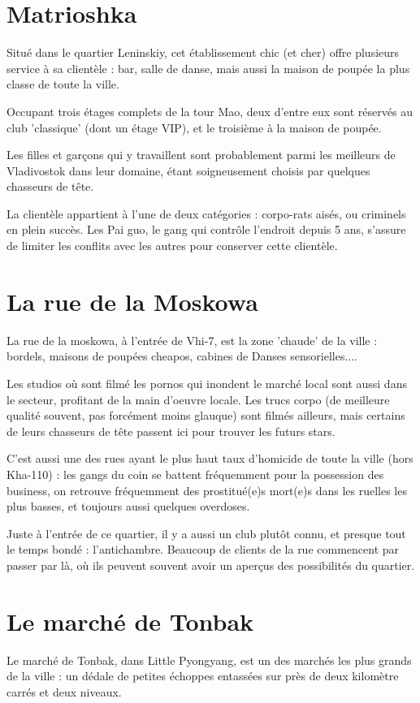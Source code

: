 \documentclass[10pt,a4paper]{book}
\begin{document}
\section{Matrioshka}
Situé dans le quartier Leninskiy, cet établissement chic (et cher) offre plusieurs service à sa clientèle : bar, salle de danse, mais aussi la maison de poupée la plus classe de toute la ville.

Occupant trois étages complets de la tour Mao, deux d'entre eux sont réservés au club 'classique' (dont un étage VIP), et le troisième à la maison de poupée. 

Les filles et garçons qui y travaillent sont probablement parmi les meilleurs de Vladivostok dans leur domaine, étant soigneusement choisis par quelques chasseurs de tête.

La clientèle appartient à l'une de deux catégories : corpo-rats aisés, ou criminels en plein succès. Les Pai guo, le gang qui contrôle l'endroit depuis 5 ans, s'assure de limiter les conflits avec les autres pour conserver cette clientèle.
\section{La rue de la Moskowa}
La rue de la moskowa, à l'entrée de Vhi-7, est la zone 'chaude' de la ville : bordels, maisons de poupées cheapos, cabines de Danses sensorielles....

Les studios où sont filmé les pornos qui inondent le marché local sont aussi dans le secteur, profitant de la main d'oeuvre locale. Les trucs corpo (de meilleure qualité souvent, pas forcément moins glauque) sont filmés ailleurs, mais certains de leurs chasseurs de tête passent ici pour trouver les futurs stars.

C'est aussi une des rues ayant le plus haut taux d'homicide de toute la ville (hors Kha-110) : les gangs du coin se battent fréquemment pour la possession des business, on retrouve fréquemment des prostitué(e)s mort(e)s dans les ruelles les plus basses, et toujours aussi quelques overdoses.

Juste à l'entrée de ce quartier, il y a aussi un club plutôt connu, et presque tout le temps bondé : l'antichambre. Beaucoup de clients de la rue commencent par passer par là, où ils peuvent souvent avoir un aperçus des possibilités du quartier.
\section{Le marché de Tonbak}
Le marché de Tonbak, dans Little Pyongyang, est un des marchés les plus grands de la ville : un dédale de petites échoppes entassées sur près de deux kilomètre carrés et deux niveaux.
\end{document}
